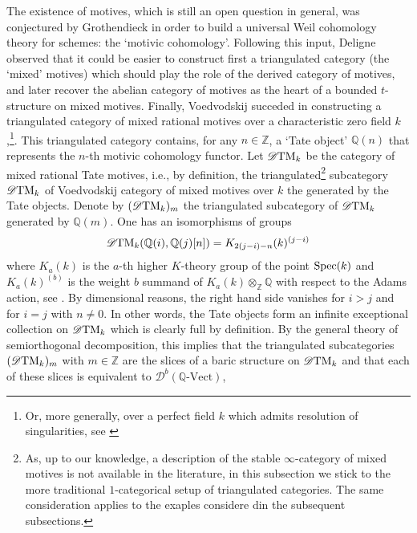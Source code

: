 \documentclass{article}
\theoremstyle{definition}
\newcommand{\Z}{\mathbb{Z}}
\begin{document}
The existence of motives, which is still an open question in general, was conjectured by Grothendieck in order to build a universal Weil cohomology theory for schemes: the `motivic cohomology'. Following this input, Deligne observed that it could be easier to construct first a triangulated category (the `mixed' motives) which should play the role of the derived category of motives, and later recover the abelian category of motives as the heart of a bounded $t$-structure on mixed motives. Finally, Voedvodskij succeded in constructing a triangulated category of mixed rational motives over a characteristic zero field $k$,\footnote{Or, more generally, over a perfect field $k$ which admits resolution of singularities, see \cite{friedlander-voedvosky-bivariant}}. This triangulated category contains, for any $n \in \Z$, a `Tate object' $\mathbb{Q}(n)$ that represents the $n$-th motivic cohomology functor. Let $\mathscr{D}\textnormal{TM}_k$ be the category of mixed rational Tate motives, i.e., by definition, the triangulated\footnote{As, up to our knowledge, a description of the stable $\infty$-category of mixed motives is not available in the literature, in this subsection we stick to the more traditional $1$-categorical setup of triangulated categories. The same consideration applies to the exaples considere din the subsequent subsections.} subcategory $\mathscr{D}\textnormal{TM}_k$ of Voedvodskij category of mixed motives over $k$ the generated by the Tate objects.  Denote by $(\mathscr{D}\textnormal{TM}_k)_{m}$ the triangulated subcategory of $\mathscr{D}\textnormal{TM}_k$ generated by $\mathbb{Q}(m)$. One has an isomorphisms of groups
  \[
   \mathscr{D}\textnormal{TM}_k(\mathbb{Q}(i),\mathbb{Q}(j)[n])=K_{2(j-i)-n}(k)^{(j-i)}
   \]
   where $K_a(k)$ is the $a$-th higher $K$-theory group of the point $\textnormal{Spec}(k)$ and $K_a(k)^{(b)}$ is the weight $b$ summand of $K_a(k) \otimes_{\mathbb{Z}} \mathbb{Q}$ with respect to the Adams action, see \cite{???}. %
  By dimensional reasons, the right hand side vanishes for $i > j$ and for $i = j$ with $n \neq 0$. In other words, the Tate objects form an infinite exceptional collection on $\mathscr{D}\textnormal{TM}_k$ which is clearly full by definition. By the general theory of semiorthogonal decomposition, this implies that the triangulated subcategories $(\mathscr{D}\textnormal{TM}_k)_{m}$ with $m\in \Z$ are the slices of a baric structure on $\mathscr{D}\textnormal{TM}_k$ and that each of these slices is equivalent to $\mathscr{D}^b(\mathbb{Q}\text{-Vect})$,
\end{document}
